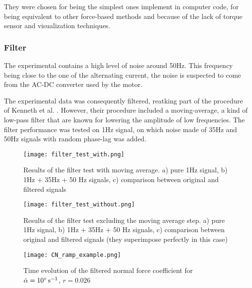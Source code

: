 They were chosen for being the simplest ones implement in computer code, for being equivalent to other force-based methods and because of the lack of torque sensor and visualization techniques.

\subsubsection{Filter}

The experimental contains a high level of noise around 50Hz. This frequency being close to the one of the alternating current, the noise is suspected to come from the AC-DC converter used by the motor. 

The experimental data was consequently filtered, reatking part of the procedure of Kenneth et al. \cite{kenneth_experiments_2011}. However, their procedure included a moving-average, a kind of low-pass filter that are known for lowering the amplitude of low frequencies. The filter performance was tested on 1Hz signal, on which noise made of 35Hz and 50Hz signals with random phase-lag was added.

\begin{figure}[h]
	\centering
	\texttt{[image: filter\_test\_with.png]}
	\caption{Results of the filter test with moving average. a) pure 1Hz signal, b) 1Hz + 35Hz + 50 Hz signals, c) comparison between original and filtered signals}
	\label{fig:filter_test_with}
\end{figure}

\begin{figure}[h]
	\centering
	\texttt{[image: filter\_test\_without.png]}
	\caption{Results of the filter test excluding the moving average step. a) pure 1Hz signal, b) 1Hz + 35Hz + 50 Hz signals, c) comparison between original and filtered signals (they superimpose perfectly in this case)}
	\label{fig:filter_test_with}
\end{figure}

\begin{figure}[h]
	\centering
	\texttt{[image: CN\_ramp\_example.png]}
	\caption{Time evolution of the filtered normal force coefficient for $\dot{\alpha}=10\si{\degree \per \second}$, $r=0.026$}
	\label{fig:ramp_example}
\end{figure}



